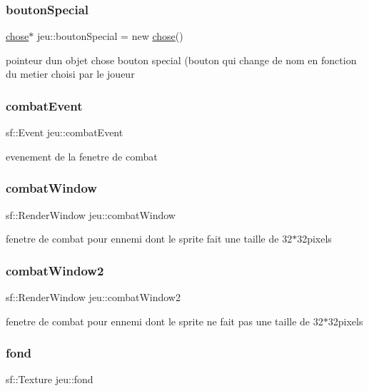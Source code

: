 \subsubsection{\texorpdfstring{bouton\+Special}{boutonSpecial}}
{\footnotesize\ttfamily \mbox{\hyperlink{classchose}{chose}}$\ast$ jeu\+::bouton\+Special = new \mbox{\hyperlink{classchose}{chose}}()}

pointeur d\textquotesingle{}un objet chose bouton special (bouton qui change de nom en fonction du metier choisi par le joueur \mbox{\label{classjeu_aa3d0d1f40c3f67f92a2bd01da43acc12}} 
\subsubsection{\texorpdfstring{combat\+Event}{combatEvent}}
{\footnotesize\ttfamily sf\+::\+Event jeu\+::combat\+Event}

evenement de la fenetre de combat \mbox{\label{classjeu_a2f5828306a38cec451fda205a71ee04c}} 
\subsubsection{\texorpdfstring{combat\+Window}{combatWindow}}
{\footnotesize\ttfamily sf\+::\+Render\+Window jeu\+::combat\+Window}

fenetre de combat pour ennemi dont le sprite fait une taille de 32$\ast$32pixels \mbox{\label{classjeu_ae6f1468cb8e294592cfe59c9bcf0cea2}} 
\subsubsection{\texorpdfstring{combat\+Window2}{combatWindow2}}
{\footnotesize\ttfamily sf\+::\+Render\+Window jeu\+::combat\+Window2}

fenetre de combat pour ennemi dont le sprite ne fait pas une taille de 32$\ast$32pixels \mbox{\label{classjeu_a4838e0877a52488f9b2adabb5c8860f2}} 
\subsubsection{\texorpdfstring{fond}{fond}}
{\footnotesize\ttfamily sf\+::\+Texture jeu\+::fond}

